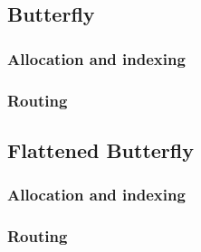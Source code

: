 
\subsection{Butterfly}
\label{subsec:tutorial:butterfly}

\subsubsection{Allocation and indexing}

\subsubsection{Routing}

\subsection{Flattened Butterfly}
\label{subsec:tutorial:fbfly}

\subsubsection{Allocation and indexing}

\subsubsection{Routing}
